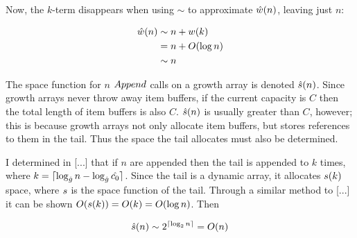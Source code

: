 Now, the $k$-term disappears when using $\sim$ to approximate $\hat{w}(n)$, leaving just $n$:

\begin{align*}
\hat{w}(n) &\sim n + w(k)\\
&= n + O(\log n)\\
&\sim n
\end{align*}

\HdrSpaceComplex

The space function for $n$ $Append$ calls on a growth array is denoted $\hat{s}(n)$. Since growth arrays never throw away item buffers, if the current capacity is $C$ then the total length of item buffers is also $C$. $\hat{s}(n)$ is usually greater than $C$, however; this is because growth arrays not only allocate item buffers, but stores references to them in the tail. Thus the space the tail allocates must also be determined.

I determined in [...] that if $n$ are appended then the tail is appended to $k$ times, where $k = \lceil \log_{\hat{g}} n - \log_{\hat{g}} \hat{c_0} \rceil$. Since the tail is a dynamic array, it allocates $s(k)$ space, where $s$ is the space function of the tail. Through a similar method to [...] it can be shown $O(s(k)) = O(k) = O(\log n)$. Then %

\begin{align*}
\hat{s}(n) \sim 2^{\lceil \log_2 n \rceil} = O(n)
\end{align*}